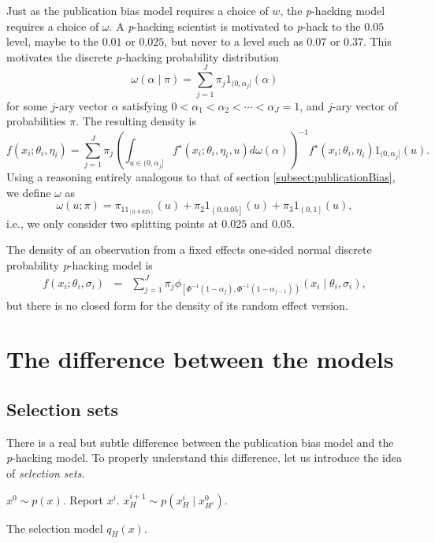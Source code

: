 \documentclass{article}
\theoremstyle{plain}
\theoremstyle{definition}
\begin{document}
Just as the publication bias model requires a choice of $w$, the \textit{p}-hacking model requires a choice of $\omega$. A \textit{p}-hacking scientist is motivated to \textit{p}-hack to the $0.05$ level, maybe to the $0.01$ or $0.025$, but never to a level such as $0.07$ or $0.37$. This motivates the discrete \emph{p-}hacking probability distribution
$$\omega\left(\alpha\mid\pi\right)=\sum_{j=1}^{J}\pi_{j}1_{(0,\alpha_{j}]}\left(\alpha\right)$$
for some $j$-ary vector $\alpha$ satisfying $0<\alpha_{1}<\alpha_{2}<\cdots<\alpha_{J}=1$,
and $j$-ary vector of probabilities $\pi$. The resulting density is 
\[
f\left(x_{i};\theta_{i},\eta_{i}\right)=\sum_{j=1}^{J}\pi_{j}\left(\int_{u\in(0,\alpha_{j}]}f^\star\left(x_{i};\theta_{i},\eta_{i}, u\right)d\omega(\alpha)\right)^{-1}f^\star\left(x_{i};\theta_{i},\eta_{i}\right)1_{(0,\alpha_{j}]}\left(u\right).
\]
Using a reasoning entirely analogous to that of section \ref{subsect:publicationBias}, we define $\omega$ as
\[
\omega\left(u;\pi\right) = \pi_11_{\left[0,0.025\right]}\left(u\right) + \pi_{2}1_{\left(0,0.05\right]}\left(u\right) + \pi_{3}1_{\left(0,1\right]}\left(u\right),
\]
i.e., we only consider two splitting points at $0.025$ and $0.05$.

The density of an observation from a fixed effects one-sided normal discrete probability \textit{p}-hacking model is
\begin{eqnarray}
f\left(x_{i};\theta_{i},\sigma_{i}\right) & = & \sum_{j=1}^{J}\pi_{j}\phi_{\left[\Phi^{-1}\left(1-\alpha_{j}\right),\Phi^{-1}\left(1-\alpha_{j-1}\right)\right)}\left(x_{i}\mid\theta_{i},\sigma_{i}\right),\label{eq:Fixed effects, p-hacking}
\end{eqnarray}
but there is no closed form for the density of its random effect version.

\section{The difference between the models}\label{sect:differences}

\subsection{Selection sets\label{sec:Selection Sets}}
There is a real but subtle difference between the publication bias model and the \textit{p}-hacking model. To properly understand this difference, let us introduce the idea of \emph{selection sets.}

\begin{algorithm}[!h]
\begin{algorithmic}[1]
	\State $x^{0}\sim p\left(x\right)$.
			\State Report $x^i$.           
		\Else         
			\State $x_{H}^{i+1}\sim p\left(x_{H}^{i}\mid x_{H^{c}}^{0}\right)$.        
		\EndIf  
	\EndFor  
\end{algorithmic}
\caption{\label{alg:Selection model}The selection model $q_{H}\left(x\right)$.}
\end{algorithm}
\end{document}
